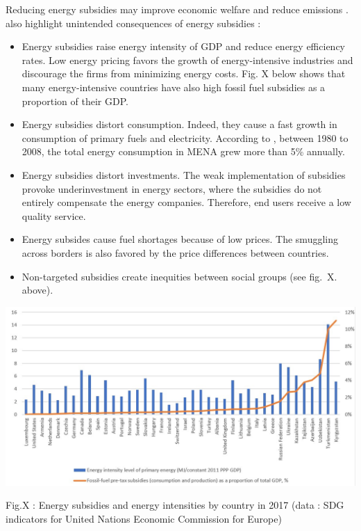 \documentclass[
]{article}
\providecommand{\tightlist}{%
  \setlength{\itemsep}{0pt}\setlength{\parskip}{0pt}}
\begin{document}
Reducing energy subsidies may improve economic welfare and reduce
emissions \autocites[ ]{aldy2013}[ ]{coady2019}{hahn2021}.
\textcite{fattouh2013} also highlight unintended consequences of energy
subsidies :

\begin{itemize}
\tightlist
\item
  Energy subsidies raise energy intensity of GDP and reduce energy
  efficiency rates. Low energy pricing favors the growth of
  energy-intensive industries and discourage the firms from minimizing
  energy costs. Fig. X below shows that many energy-intensive countries
  have also high fossil fuel subsidies as a proportion of their GDP.
\item
  Energy subsidies distort consumption. Indeed, they cause a fast growth
  in consumption of primary fuels and electricity. According to
  \textcite{fattouh2013}, between 1980 to 2008, the total energy
  consumption in MENA grew more than 5\% annually.
\item
  Energy subsidies distort investments. The weak implementation of
  subsidies provoke underinvestment in energy sectors, where the
  subsidies do not entirely compensate the energy companies. Therefore,
  end users receive a low quality service.
\item
  Energy subsides cause fuel shortages because of low prices. The
  smuggling across borders is also favored by the price differences
  between countries.
\item
  Non-targeted subsidies create inequities between social groups (see
  fig.~X. above).
\end{itemize}

\includegraphics{Images/Subsidies - energy intensity.jpg}

Fig.X : Energy subsidies and energy intensities by country in 2017 (data
: SDG indicators for United Nations Economic Commission for Europe)
\end{document}
